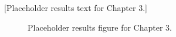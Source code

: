 [Placeholder results text for Chapter 3.]

\begin{figure}[htbp]
  \caption{Placeholder results figure for Chapter 3.}
  \label{fig:ch3-results}
\end{figure}
